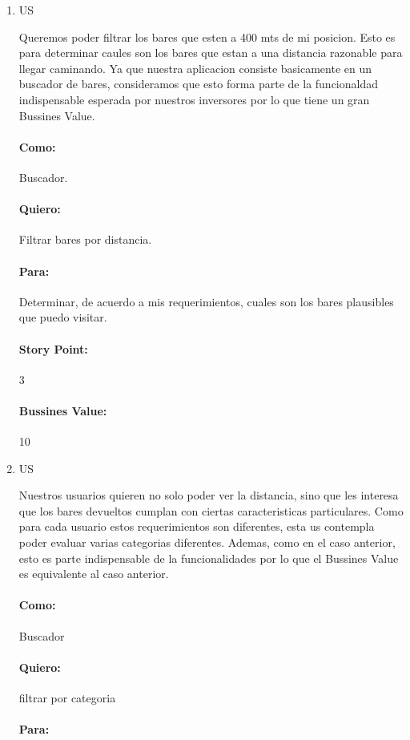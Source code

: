 \documentclass[10pt,a4paper]{article}
\begin{document}
\begin{enumerate}
 \item US
 
Queremos poder filtrar los bares que esten a 400 mts de mi posicion. Esto es para determinar caules son los bares que estan a una distancia razonable para llegar caminando. Ya que nuestra
aplicacion consiste basicamente en un buscador de bares, consideramos que esto forma parte de la funcionaldad indispensable esperada por nuestros inversores %
por lo que tiene un gran Bussines Value.
\paragraph{Como:} Buscador.
\paragraph{Quiero:} Filtrar bares por distancia.
\paragraph{Para:} Determinar, de acuerdo a mis requerimientos, cuales son los bares plausibles que puedo visitar.
\paragraph{Story Point:} 3
\paragraph{Bussines Value:} 10


 \item US
 
Nuestros usuarios quieren no solo poder ver la distancia, sino que les interesa que los bares devueltos cumplan con ciertas caracteristicas particulares. Como para cada usuario estos
requerimientos son diferentes, esta us contempla poder evaluar varias categorias diferentes. Ademas, como en el caso anterior, esto es parte indispensable de la funcionalidades
 por lo que el Bussines Value es equivalente al caso anterior.
\paragraph{Como:} Buscador
\paragraph{Quiero:} filtrar por categoria
\paragraph{Para:}

\end{enumerate}
\end{document}
